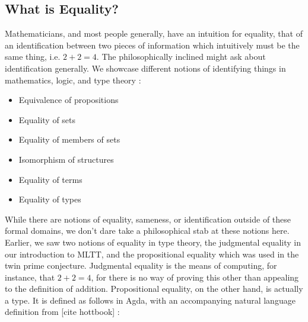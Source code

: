 \subsection{What is Equality?}


Mathematicians, and most people generally, have an intuition
for equality, that of an identification between two pieces of information
which intuitively must be the same thing, i.e. $2+2=4$. The philosophically
inclined might ask about identification generally. We showcase different
notions of identifying things in mathematics, logic, and type theory :

\begin{itemize}
\item Equivalence of propositions 
\item Equality of sets
\item Equality of members of sets
\item Isomorphism of structures
\item Equality of terms
\item Equality of types
\end{itemize}

While there are notions of equality, sameness, or identification outside of
these formal domains, we don't dare take a philosophical stab at these notions here. 
Earlier, we saw two notions of equality in type theory, the judgmental equality
in our introduction to MLTT, and the propositional equality which was used in
the twin prime conjecture. Judgmental equality is the means of computing, for
instance, that $2+2=4$, for there is no way of proving this other than appealing
to the definition of addition. Propositional equality, on the other hand, is
actually a type. It is defined as follows in Agda, with an accompanying natural
language definition from [cite hottbook] :


